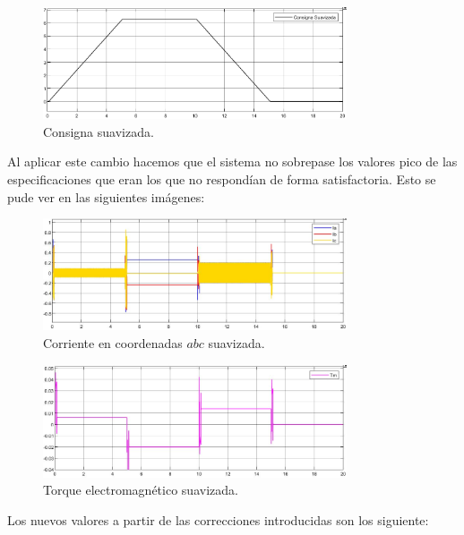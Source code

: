 \documentclass{article}
\begin{document}
\begin{figure}[H]
    \centering
    \includegraphics[width=0.8\textwidth]{5.2..5.1.a.2.png}
    \caption{Consigna suavizada.}
\end{figure}

Al aplicar este cambio hacemos que el sistema no sobrepase los valores pico de las especificaciones
que eran los que no respondían de forma satisfactoria. Esto se pude ver en las siguientes imágenes:

\begin{figure}[H]
    \centering
    \includegraphics[width=0.8\textwidth]{5.2..5.1.a.4.png}
    \caption{Corriente en coordenadas $abc$ suavizada.}
\end{figure}

\begin{figure}[H]
    \centering
    \includegraphics[width=0.8\textwidth]{5.2..5.1.a.5.png}
    \caption{Torque electromagnético suavizada.}
\end{figure}

Los nuevos valores a partir de las correcciones introducidas son los siguiente:
\end{document}
